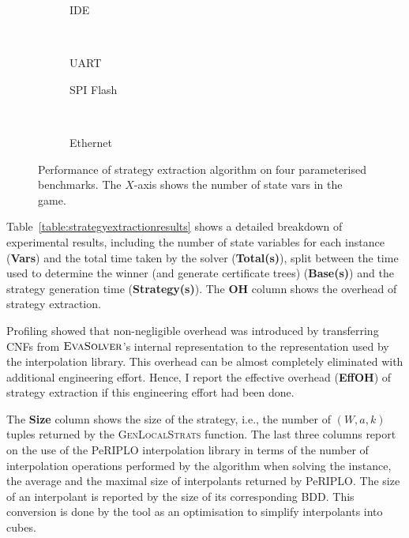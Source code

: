 \begin{figure}
\centering
\small
\begin{subfigure}{.5\linewidth}
  \centering
  \caption{IDE}
  \label{fig:sub1}
\end{subfigure}%
~
\begin{subfigure}{.5\linewidth}
  \centering
  \caption{UART}
  \label{fig:sub2}
\end{subfigure}
\begin{subfigure}{.5\linewidth}
  \centering
  \caption{SPI Flash}
  \label{fig:sub1}
\end{subfigure}%
~
\begin{subfigure}{.5\linewidth}
  \centering
  \caption{Ethernet}
  \label{fig:sub2}
\end{subfigure}
\vspace{-3mm}
\caption{Performance of strategy extraction algorithm on four parameterised benchmarks.
The $X$-axis shows the number of state vars in the game.}
\vspace{-4mm}
\label{f:graphs}
\end{figure}

Table~\ref{table:strategyextractionresults} shows a detailed breakdown of experimental results, including the number of state variables for each instance (\textbf{Vars}) and the total time taken by the solver (\textbf{Total(s)}), split between the time used to determine the winner (and generate certificate trees) (\textbf{Base(s)}) and the strategy generation time (\textbf{Strategy(s)}). The \textbf{OH} column shows the overhead of strategy extraction.

Profiling showed that non-negligible overhead was introduced by transferring CNFs from $\textsc{EvaSolver}$'s internal representation to the representation used by the interpolation library.  This overhead can be almost completely eliminated with additional engineering effort.  Hence, I report the effective overhead (\textbf{EffOH}) of strategy extraction if this engineering effort had been done.

The \textbf{Size} column shows the size of the strategy, i.e., the number of $(W,a,k)$ tuples returned by the \textsc{GenLocalStrats} function.  The last three columns report on the use of the PeRIPLO interpolation library in terms of the number of interpolation operations performed by the algorithm when solving the instance, the average and the maximal size of interpolants returned by PeRIPLO.  The size of an interpolant is reported by the size of its corresponding BDD. This conversion is done by the tool as an optimisation to simplify interpolants into cubes.


